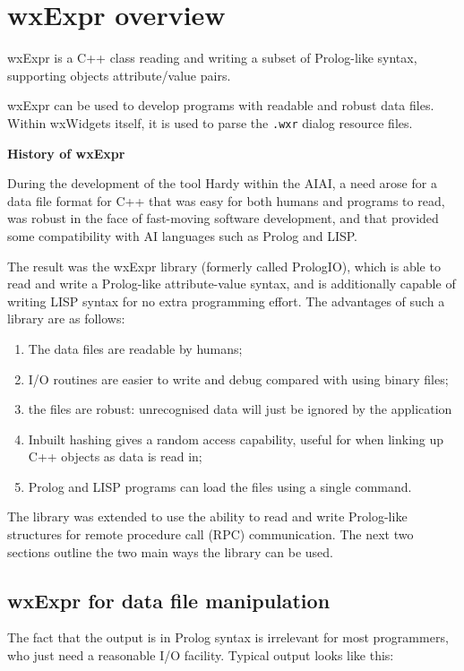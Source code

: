 \section{wxExpr overview}\label{exproverview}

wxExpr is a C++ class reading and writing a subset of Prolog-like syntax,
supporting objects attribute/value pairs.

wxExpr can be used to develop programs with readable and
robust data files. Within wxWidgets itself, it is used to parse
the {\tt .wxr} dialog resource files.

{\bf History of wxExpr}

During the development of the tool Hardy within the AIAI, a need arose
for a data file format for C++ that was easy for both humans and
programs to read, was robust in the face of fast-moving software
development, and that provided some compatibility with AI languages
such as Prolog and LISP.

The result was the wxExpr library (formerly called PrologIO), which is able to read and write a
Prolog-like attribute-value syntax, and is additionally capable of
writing LISP syntax for no extra programming effort.  The advantages of
such a library are as follows:

\begin{enumerate}\itemsep=0pt
\item The data files are readable by humans;
\item I/O routines are easier to write and debug compared with using binary files;
\item the files are robust: unrecognised data will just be ignored by the application
\item Inbuilt hashing gives a random access capability, useful for when linking
up C++ objects as data is read in;
\item Prolog and LISP programs can load the files using a single command.
\end{enumerate}

The library was extended to use the ability to read and write
Prolog-like structures for remote procedure call (RPC) communication.
The next two sections outline the two main ways the library can be used.

\subsection{wxExpr for data file manipulation}\itemsep=0pt

The fact that the output is in Prolog syntax is irrelevant for most
programmers, who just need a reasonable I/O facility.  Typical output
looks like this:


